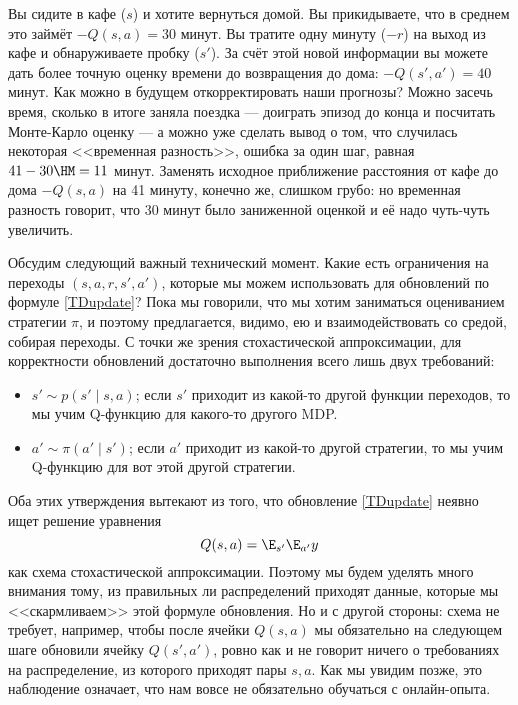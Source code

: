 \begin{exampleBox}[label=ex:cafe]{}
Вы сидите в кафе ($s$) и хотите вернуться домой. Вы прикидываете, что в среднем это займёт $-Q(s, a) = 30$ минут. Вы тратите одну минуту ($-r$) на выход из кафе и обнаруживаете пробку ($s'$). За счёт этой новой информации вы можете дать более точную оценку времени до возвращения до дома: $-Q(s', a') = 40$ минут. Как можно в будущем откорректировать наши прогнозы? Можно засечь время, сколько в итоге заняла поездка --- доиграть эпизод до конца и посчитать Монте-Карло оценку --- а можно уже сделать вывод о том, что случилась некоторая <<временная разность>>, ошибка за один шаг, равная $41 - 30 \HM= 11$ минут. Заменять исходное приближение расстояния от кафе до дома $-Q(s, a)$ на 41 минуту, конечно же, слишком грубо: но временная разность говорит, что 30 минут было заниженной оценкой и её надо чуть-чуть увеличить.
\end{exampleBox}

Обсудим следующий важный технический момент. Какие есть ограничения на переходы $(s, a, r, s', a')$, которые мы можем использовать для обновлений по формуле \eqref{TDupdate}? Пока мы говорили, что мы хотим заниматься оцениванием стратегии $\pi$, и поэтому предлагается, видимо, ею и взаимодействовать со средой, собирая переходы. С точки же зрения стохастической аппроксимации, для корректности обновлений достаточно выполнения всего лишь двух требований:
\begin{itemize}
    \item $s' \sim p(s' \mid s, a)$; если $s'$ приходит из какой-то другой функции переходов, то мы учим Q-функцию для какого-то другого MDP.
    \item $a' \sim \pi(a' \mid s')$; если $a'$ приходит из какой-то другой стратегии, то мы учим Q-функцию для вот этой другой стратегии.
\end{itemize}
Оба этих утверждения вытекают из того, что обновление \eqref{TDupdate} неявно ищет решение уравнения
$$Q(s, a) = \E_{s'} \E_{a'} y$$
как схема стохастической аппроксимации. Поэтому мы будем уделять много внимания тому, из правильных ли распределений приходят данные, которые мы <<скармливаем>> этой формуле обновления. Но и с другой стороны: схема не требует, например, чтобы после ячейки $Q(s, a)$ мы обязательно на следующем шаге обновили ячейку $Q(s', a')$, ровно как и не говорит ничего о требованиях на распределение, из которого приходят пары $s, a$. Как мы увидим позже, это наблюдение означает, что нам вовсе не обязательно обучаться с онлайн-опыта.

